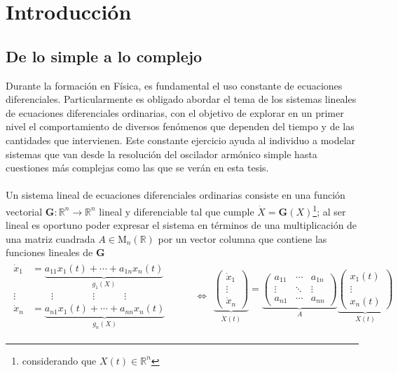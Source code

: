 \chapter{Introducción}

\section*{De lo simple a lo complejo}

\setlength{\parindent}{0cm} Durante la formación en Física, es fundamental el uso constante de ecuaciones diferenciales. Particularmente es obligado abordar el tema de los sistemas lineales de ecuaciones diferenciales ordinarias, con el objetivo de explorar en un primer nivel el comportamiento de diversos fenómenos que dependen del tiempo y de las cantidades que intervienen. Este constante ejercicio ayuda al individuo a modelar sistemas que van desde la resolución del oscilador armónico simple hasta cuestiones más complejas como las que se verán en esta tesis.\\
\\
Un sistema lineal de ecuaciones diferenciales ordinarias consiste en una función vectorial $\textbf{G}:\mathbb{R}^n\to\mathbb{R}^n$ lineal y diferenciable tal que cumple 
$\dot{X}=\textbf{G}(X)$\footnote{considerando que $X(t)\in\mathbb{R}^n$}; al ser lineal es oportuno poder expresar el sistema en términos de una multiplicación de una matriz cuadrada $A\in \mathrm{M}_{n}(\mathbb{R})$ por un vector columna que contiene las funciones lineales de $\textbf{G}$ \cite{hirsch2013differential}
\begin{align*}
	\begin{split}
		\dot{x}_1 &= \underbrace{a_{11}x_1(t)+\cdots+a_{1n}x_n(t)}_{g_1(X)}             \\
		\vdots &\qquad \vdots\qquad\qquad\vdots\qquad\quad\vdots  \\
		\dot{x}_n &= \underbrace{a_{n1}x_1(t)+\cdots+a_{nn}x_n(t)}_{g_n(X)}             
	\end{split}	          
	\qquad\ \ \, \Longleftrightarrow
	\begin{split}
		\underbrace{\begin{pmatrix}
				\dot{x}_1\\
				\vdots\\
				\dot{x}_n
		\end{pmatrix}}_{\dot{X}(t)}=\underbrace{\begin{pmatrix}
				a_{11} & \cdots & a_{1n}\\
				\vdots & \ddots & \vdots\\
				a_{n1} & \cdots & a_{nn}
		\end{pmatrix}}_{A}\underbrace{\begin{pmatrix}
				x_1(t)\\
				\vdots\\
				x_n(t)
		\end{pmatrix}}_{X(t)}
	\end{split} 
\end{align*}
